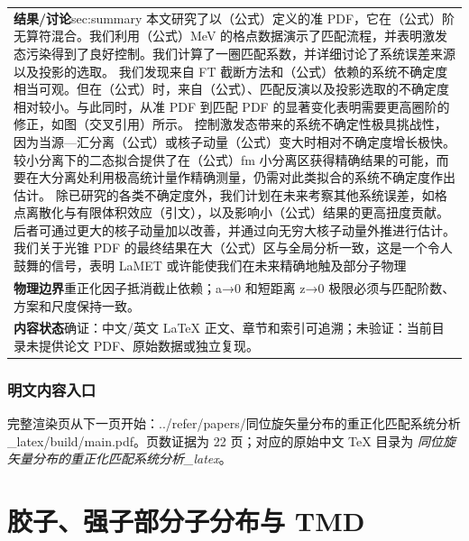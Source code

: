 \documentclass[UTF8,11pt,oneside]{ctexbook}
\begin{document}
\begin{table}[htbp]
\begin{tabular}{@{}p{}@{}}
    \textbf{结果/讨论}\quad sec:summary 本文研究了以（公式）定义的准 PDF，它在（公式）阶无算符混合。我们利用（公式）MeV 的格点数据演示了匹配流程，并表明激发态污染得到了良好控制。我们计算了一圈匹配系数，并详细讨论了系统误差来源以及投影的选取。 我们发现来自 FT 截断方法和（公式）依赖的系统不确定度相当可观。但在（公式）时，来自（公式）、匹配反演以及投影选取的不确定度相对较小。与此同时，从准 PDF 到匹配 PDF 的显著变化表明需要更高圈阶的修正，如图（交叉引用）所示。 控制激发态带来的系统不确定性极具挑战性，因为当源—汇分离（公式）或核子动量（公式）变大时相对不确定度增长极快。较小分离下的二态拟合提供了在（公式）fm 小分离区获得精确结果的可能，而要在大分离处利用极高统计量作精确测量，仍需对此类拟合的系统不确定度作出估计。 除已研究的各类不确定度外，我们计划在未来考察其他系统误差，如格点离散化与有限体积效应（引文），以及影响小（公式）结果的更高扭度贡献。后者可通过更大的核子动量加以改善，并通过向无穷大核子动量外推进行估计。 我们关于光锥 PDF 的最终结果在大（公式）区与全局分析一致，这是一个令人鼓舞的信号，表明 LaMET 或许能使我们在未来精确地触及部分子物理 \\
    \textbf{物理边界}\quad 重正化因子抵消截止依赖；a→0 和短距离 z→0 极限必须与匹配阶数、方案和尺度保持一致。 \\
    \textbf{内容状态}\quad 确证：中文/英文 LaTeX 正文、章节和索引可追溯；未验证：当前目录未提供论文 PDF、原始数据或独立复现。 \\
    \bottomrule
  \end{tabular}
\end{table}
\section*{明文内容入口}
\noindent 完整渲染页从下一页开始：../\allowbreak{}refer/\allowbreak{}papers/\allowbreak{}同位旋矢量分布的重正化匹配系统分析\_\allowbreak{}latex/\allowbreak{}build/\allowbreak{}main.pdf。页数证据为 22 页；对应的原始中文 TeX 目录为 \emph{同位旋矢量分布的重正化匹配系统分析\_latex}。
\clearpage

\clearpage

\part{胶子、强子部分子分布与 TMD}
\end{document}
